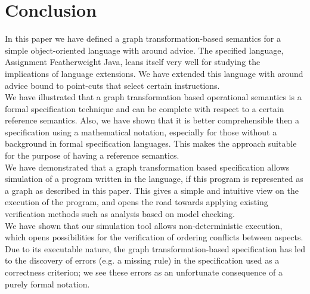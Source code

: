 \section{Conclusion}\label{sec:gr-conclusion}

In this paper we have defined a graph transformation-based semantics for a simple object-oriented language with around advice. The specified language, Assignment Featherweight Java, leans itself very well for studying the implications of language extensions. We have extended this language with around advice bound to point-cuts that select certain instructions.\\
We have illustrated that a graph transformation based operational semantics is a formal specification technique and can be complete with respect to a certain reference semantics. Also, we have shown that it is better comprehensible then a specification using a mathematical notation, especially for those without a background in formal specification languages. This makes the approach suitable for the purpose of having a reference semantics.\\
We have demonstrated that a graph transformation based specification allows simulation of a program written in the language, if this program is represented as a graph as described in this paper. This gives a simple and intuitive view on the execution of the program, and opens the road towards applying existing verification methods such as analysis based on model checking.\\
We have shown that our simulation tool allows non-determi{\-}nistic execution, which opens possibilities for the verification of ordering conflicts between aspects.\\
Due to its executable nature, the graph transformation-based specification has led to the discovery of errors (e.g. a missing rule) in the specification used as a correctness criterion; we see these errors as an unfortunate consequence of a purely formal notation.\\
